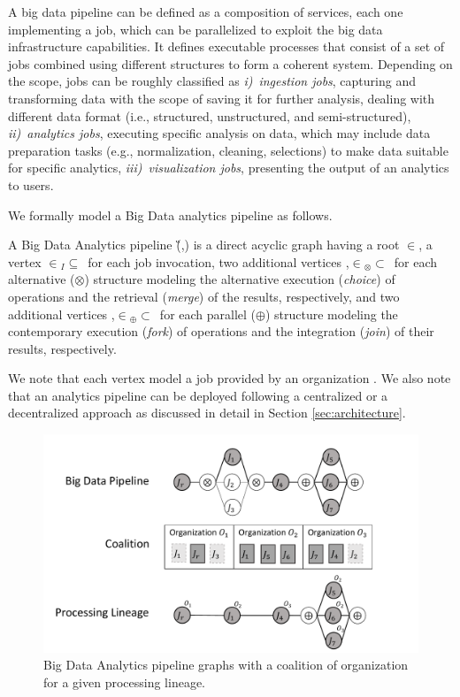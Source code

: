 A big data pipeline can be defined as a composition of services, each one implementing a job, which can be parallelized to exploit the big data infrastructure capabilities.
It defines executable processes that consist of a set of jobs combined using different structures to form a coherent system.
Depending on the scope, jobs can be roughly classified as
  {\em i)}~\emph{ingestion jobs}, capturing and transforming data with the scope of saving it for further analysis, dealing with different data format (i.e., structured, unstructured, and semi-structured),
{\em ii)}~\emph{analytics jobs}, executing specific analysis on data, which may include data preparation tasks (e.g., normalization, cleaning, selections) to make data suitable for specific analytics,
{\em iii)~visualization jobs}, presenting the output of an analytics to users.

We formally model a Big Data analytics pipeline as follows.

\begin{definition} \label{def:pipeline}
  A Big Data Analytics pipeline \G(\V,\E) is a direct acyclic graph having a root $\in$\V, a vertex $\in$\V$_I$$\subseteq$\V\ for each job  invocation, two additional vertices ,$\in$\V$_{\otimes}$$\subset$\V\ for each alternative ($\otimes$) structure modeling the alternative execution (\emph{choice}) of operations and the retrieval (\emph{merge}) of the results, respectively, and two additional vertices ,$\in$\V$_{\oplus}$$\subset$\V\ for each parallel ($\oplus$) structure modeling the contemporary execution (\emph{fork}) of operations and the integration (\emph{join}) of their results, respectively.
\end{definition}

We note that each vertex  model a job  provided by an organization .
We also note that an analytics pipeline can be deployed following a centralized or a decentralized approach as discussed in detail in Section \ref{sec:architecture}.

\begin{figure}[!t]
  \includegraphics[width=0.98\columnwidth]{generaleFig1.pdf}
  \caption{Big Data Analytics pipeline graphs with a coalition of organization for a given processing lineage.}\label{fig:BDpipeline}
\end{figure}

